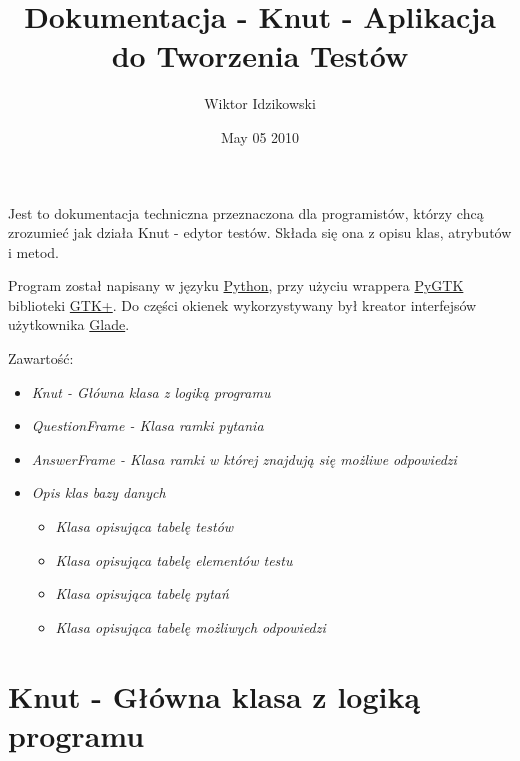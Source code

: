 \documentclass[letterpaper,10pt,polish]{manual}
\title{Dokumentacja - Knut - Aplikacja do Tworzenia Testów}
\date{May 05 2010}
\author{Wiktor Idzikowski}
\begin{document}
\maketitle
\tableofcontents
\hypertarget{--doc-index}{}


Jest to dokumentacja techniczna przeznaczona dla programistów, którzy chcą zrozumieć jak działa Knut - edytor testów. Składa się ona z opisu klas, atrybutów i metod.

Program został napisany w języku \href{http://python.org}{Python}, przy użyciu wrappera \href{http://www.pygtk.org}{PyGTK} biblioteki \href{http://gtk.org}{GTK+}. Do części okienek wykorzystywany był kreator interfejsów użytkownika \href{http://glade.gnome.org}{Glade}.

Zawartość:
\begin{itemize}
\item {} 
\emph{Knut - Główna klasa z logiką programu}

\item {} 
\emph{QuestionFrame - Klasa ramki pytania}

\item {} 
\emph{AnswerFrame - Klasa ramki w której znajdują się możliwe odpowiedzi}

\item {} 
\emph{Opis klas bazy danych}
\begin{itemize}
\item {} 
\emph{Klasa opisująca tabelę testów}

\item {} 
\emph{Klasa opisująca tabelę elementów testu}

\item {} 
\emph{Klasa opisująca tabelę pytań}

\item {} 
\emph{Klasa opisująca tabelę możliwych odpowiedzi}

\end{itemize}

\end{itemize}
\hypertarget{knut}{}

\chapter{Knut - Główna klasa z logiką programu}
\hypertarget{module-Knut}{}
\modulesynopsis{}
\end{document}
